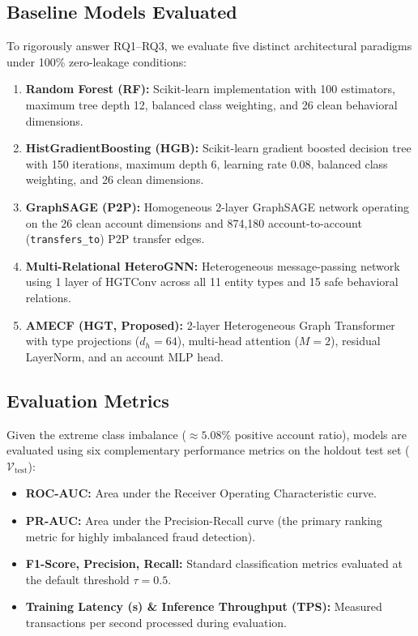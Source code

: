 \documentclass[conference]{IEEEtran}
\begin{document}
\subsection{Baseline Models Evaluated}
To rigorously answer RQ1--RQ3, we evaluate five distinct architectural paradigms under 100\% zero-leakage conditions:
\begin{enumerate}
    \item \textbf{Random Forest (RF):} Scikit-learn implementation with 100 estimators, maximum tree depth 12, balanced class weighting, and 26 clean behavioral dimensions.
    \item \textbf{HistGradientBoosting (HGB):} Scikit-learn gradient boosted decision tree with 150 iterations, maximum depth 6, learning rate 0.08, balanced class weighting, and 26 clean dimensions.
    \item \textbf{GraphSAGE (P2P):} Homogeneous 2-layer GraphSAGE network operating on the 26 clean account dimensions and 874,180 account-to-account (\texttt{transfers\_to}) P2P transfer edges.
    \item \textbf{Multi-Relational HeteroGNN:} Heterogeneous message-passing network using 1 layer of HGTConv across all 11 entity types and 15 safe behavioral relations.
    \item \textbf{AMECF (HGT, Proposed):} 2-layer Heterogeneous Graph Transformer with type projections ($d_h = 64$), multi-head attention ($M = 2$), residual LayerNorm, and an account MLP head.
\end{enumerate}

\subsection{Evaluation Metrics}
Given the extreme class imbalance ($\approx 5.08\%$ positive account ratio), models are evaluated using six complementary performance metrics on the holdout test set ($\mathcal{V}_{\text{test}}$):
\begin{itemize}
    \item \textbf{ROC-AUC:} Area under the Receiver Operating Characteristic curve.
    \item \textbf{PR-AUC:} Area under the Precision-Recall curve (the primary ranking metric for highly imbalanced fraud detection).
    \item \textbf{F1-Score, Precision, Recall:} Standard classification metrics evaluated at the default threshold $\tau = 0.5$.
    \item \textbf{Training Latency (s) \& Inference Throughput (TPS):} Measured transactions per second processed during evaluation.
\end{itemize}
\end{document}
